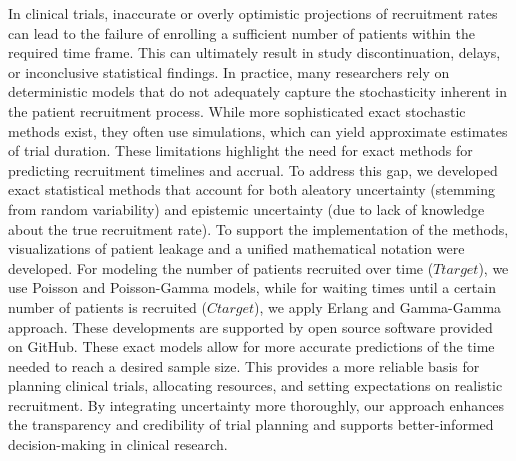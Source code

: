 \documentclass[11pt,a4paper,twoside]{book}
\begin{document}
\noindent
In clinical trials, inaccurate or overly optimistic projections of recruitment rates can lead to the failure of enrolling a sufficient number of patients within the required time frame. This can ultimately result in study discontinuation, delays, or inconclusive statistical findings. In practice, many researchers rely on deterministic models that do not adequately capture the stochasticity inherent in the patient recruitment process. While more sophisticated exact stochastic methods exist, they often use simulations, which can yield approximate estimates of trial duration. These limitations highlight the need for exact methods for predicting recruitment timelines and accrual. To address this gap, we developed exact statistical methods that account for both aleatory uncertainty (stemming from random variability) and epistemic uncertainty (due to lack of knowledge about the true recruitment rate). To support the implementation of the methods, visualizations of patient leakage and a unified mathematical notation were developed. For modeling the number of patients recruited over time  ($Ttarget$), we use Poisson and Poisson-Gamma models, while for waiting times until a certain number of patients is recruited ($Ctarget$), we apply Erlang and Gamma-Gamma approach. These developments are supported by open source software provided on GitHub. These exact models allow for more accurate predictions of the time needed to reach a desired sample size. This provides a more reliable basis for planning clinical trials, allocating resources, and setting expectations on realistic recruitment. By integrating uncertainty more thoroughly, our approach enhances the transparency and credibility of trial planning and supports better-informed decision-making in clinical research.

\vspace{2em}  %








\end{document}
